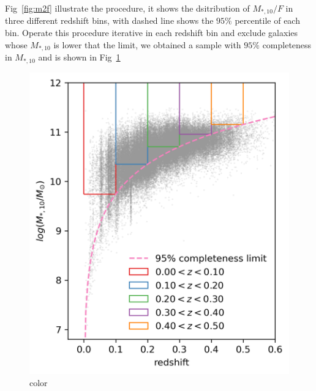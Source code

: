 \documentclass[fleqn,usenatbib]{mnras}
\begin{document}
\par Fig~\ref{fig:m2f} illustrate the procedure, it shows the dsitribution of $M_{*,10} / F$ in three different redshift bins, with dashed line shows the $95\%$ percentile of each bin. Operate this procedure iterative in each redshift bin and exclude galaxies whose $M_{*,10}$ is lower that the limit, we obtained a sample with $95\%$ completeness in $M_{*,10}$ and is shown in Fig~\ref{fig:completeness_cut}
\begin{figure}
    \centering
    \includegraphics[width = \linewidth]{figure/completeness_cut.png}
    \caption{color}
    \label{fig:completeness_cut}
\end{figure}
\end{document}
